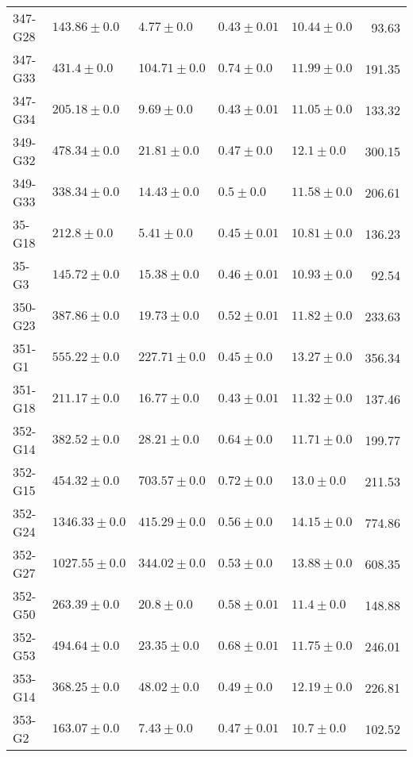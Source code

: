 \begin{tabular}{lllllr}
    347-G28 &     $143.86 \pm 0.0$ &        $4.77 \pm 0.0$ &  $0.43 \pm 0.01$ &  $10.44 \pm 0.0$ &     93.63 \\
    347-G33 &      $431.4 \pm 0.0$ &      $104.71 \pm 0.0$ &   $0.74 \pm 0.0$ &  $11.99 \pm 0.0$ &    191.35 \\
    347-G34 &     $205.18 \pm 0.0$ &        $9.69 \pm 0.0$ &  $0.43 \pm 0.01$ &  $11.05 \pm 0.0$ &    133.32 \\
    349-G32 &     $478.34 \pm 0.0$ &       $21.81 \pm 0.0$ &   $0.47 \pm 0.0$ &   $12.1 \pm 0.0$ &    300.15 \\
    349-G33 &     $338.34 \pm 0.0$ &       $14.43 \pm 0.0$ &    $0.5 \pm 0.0$ &  $11.58 \pm 0.0$ &    206.61 \\
     35-G18 &      $212.8 \pm 0.0$ &        $5.41 \pm 0.0$ &  $0.45 \pm 0.01$ &  $10.81 \pm 0.0$ &    136.23 \\
      35-G3 &     $145.72 \pm 0.0$ &       $15.38 \pm 0.0$ &  $0.46 \pm 0.01$ &  $10.93 \pm 0.0$ &     92.54 \\
    350-G23 &     $387.86 \pm 0.0$ &       $19.73 \pm 0.0$ &  $0.52 \pm 0.01$ &  $11.82 \pm 0.0$ &    233.63 \\
     351-G1 &     $555.22 \pm 0.0$ &      $227.71 \pm 0.0$ &   $0.45 \pm 0.0$ &  $13.27 \pm 0.0$ &    356.34 \\
    351-G18 &     $211.17 \pm 0.0$ &       $16.77 \pm 0.0$ &  $0.43 \pm 0.01$ &  $11.32 \pm 0.0$ &    137.46 \\
    352-G14 &     $382.52 \pm 0.0$ &       $28.21 \pm 0.0$ &   $0.64 \pm 0.0$ &  $11.71 \pm 0.0$ &    199.77 \\
    352-G15 &     $454.32 \pm 0.0$ &      $703.57 \pm 0.0$ &   $0.72 \pm 0.0$ &   $13.0 \pm 0.0$ &    211.53 \\
    352-G24 &    $1346.33 \pm 0.0$ &      $415.29 \pm 0.0$ &   $0.56 \pm 0.0$ &  $14.15 \pm 0.0$ &    774.86 \\
    352-G27 &    $1027.55 \pm 0.0$ &      $344.02 \pm 0.0$ &   $0.53 \pm 0.0$ &  $13.88 \pm 0.0$ &    608.35 \\
    352-G50 &     $263.39 \pm 0.0$ &        $20.8 \pm 0.0$ &  $0.58 \pm 0.01$ &   $11.4 \pm 0.0$ &    148.88 \\
    352-G53 &     $494.64 \pm 0.0$ &       $23.35 \pm 0.0$ &  $0.68 \pm 0.01$ &  $11.75 \pm 0.0$ &    246.01 \\
    353-G14 &     $368.25 \pm 0.0$ &       $48.02 \pm 0.0$ &   $0.49 \pm 0.0$ &  $12.19 \pm 0.0$ &    226.81 \\
     353-G2 &     $163.07 \pm 0.0$ &        $7.43 \pm 0.0$ &  $0.47 \pm 0.01$ &   $10.7 \pm 0.0$ &    102.52 \\

\end{tabular}
